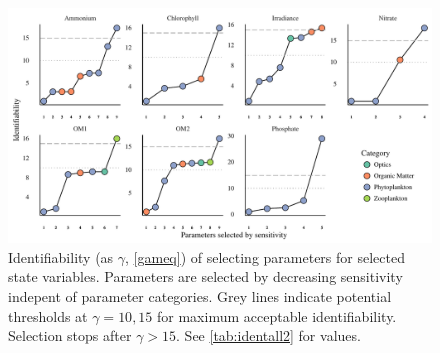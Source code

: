 \documentclass[letterpaper,12pt,oneside]{article}\usepackage[]{graphicx}\usepackage[]{color}
\newcommand{\beginsupplement}{%
        \setcounter{table}{0}
        \renewcommand{\thetable}{S\arabic{table}}%
        \setcounter{figure}{0}
        \renewcommand{\thefigure}{S\arabic{figure}}%
     }
\begin{document}
\begin{figure}[!ht]

{\centering \includegraphics[width=\textwidth]{figs/heurist_stts-1} 

}

\caption{Identifiability (as $\gamma$, \cref{gameq}) of selecting parameters for selected state variables. Parameters are selected by decreasing sensitivity indepent of parameter categories. Grey lines indicate potential thresholds at $\gamma = 10, 15$ for maximum acceptable identifiability. Selection stops after $\gamma > 15$.  See \cref{tab:identall2} for values.}\label{fig:heurist_stts}
\end{figure}


\clearpage

\beginsupplement
\end{document}
